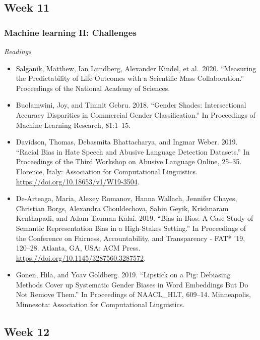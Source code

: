 \documentclass[
  10pt,
]{article}
\providecommand{\tightlist}{%
  \setlength{\itemsep}{0pt}\setlength{\parskip}{0pt}}
\begin{document}
\hypertarget{week-11}{%
\subsection{Week 11}\label{week-11}}

\hypertarget{machine-learning-ii-challenges}{%
\subsubsection{Machine learning II:
Challenges}\label{machine-learning-ii-challenges}}

\emph{Readings}

\begin{itemize}
\tightlist
\item
  Salganik, Matthew, Ian Lundberg, Alexander Kindel, et al.~2020.
  ``Measuring the Predictability of Life Outcomes with a Scientiﬁc Mass
  Collaboration.'' Proceedings of the National Academy of Sciences.
\item
  Buolamwini, Joy, and Timnit Gebru. 2018. ``Gender Shades:
  Intersectional Accuracy Disparities in Commercial Gender
  Classiﬁcation.'' In Proceedings of Machine Learning Research,
  81:1--15.
\item
  Davidson, Thomas, Debasmita Bhattacharya, and Ingmar Weber. 2019.
  ``Racial Bias in Hate Speech and Abusive Language Detection
  Datasets.'' In Proceedings of the Third Workshop on Abusive Language
  Online, 25--35. Florence, Italy: Association for Computational
  Linguistics. \url{https://doi.org/10.18653/v1/W19-3504}.
\item
  De-Arteaga, Maria, Alexey Romanov, Hanna Wallach, Jennifer Chayes,
  Christian Borgs, Alexandra Chouldechova, Sahin Geyik, Krishnaram
  Kenthapadi, and Adam Tauman Kalai. 2019. ``Bias in Bios: A Case Study
  of Semantic Representation Bias in a High-Stakes Setting.'' In
  Proceedings of the Conference on Fairness, Accountability, and
  Transparency - FAT* '19, 120--28. Atlanta, GA, USA: ACM Press.
  \url{https://doi.org/10.1145/3287560.3287572}.
\item
  Gonen, Hila, and Yoav Goldberg. 2019. ``Lipstick on a Pig: Debiasing
  Methods Cover up Systematic Gender Biases in Word Embeddings But Do
  Not Remove Them.'' In Proceedings of NAACL\_HLT, 609--14. Minneapolis,
  Minnesota: Association for Computational Linguistics.
\end{itemize}

\hypertarget{week-12}{%
\subsection{Week 12}\label{week-12}}
\end{document}
